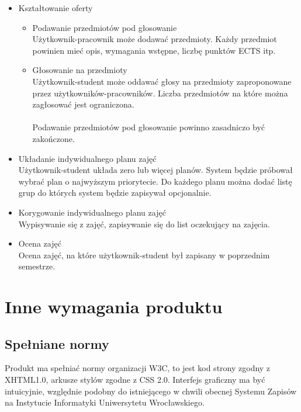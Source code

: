 \documentclass[11pt,leqno]{article}
\begin{document}
\begin{itemize}
\item Kształtowanie oferty
\begin{itemize}
\item Podawanie przedmiotów pod głosowanie \\
Użytkownik-pracownik może dodawać przedmioty. Każdy przedmiot powinien mieć opis, wymagania wstępne, liczbę punktów ECTS itp.

\item Głosowanie na przedmioty \\
Użytkownik-student może oddawać głosy na przedmioty zaproponowane przez użytkowników-pracowników. Liczba przedmiotów na które można zagłosować jest ograniczona. \\ \\

Podawanie przedmiotów pod głosowanie powinno zasadniczo być zakończone.
\end{itemize}

\item Układanie indywidualnego planu zajęć \\
Użytkownik-student układa zero lub więcej planów. System będzie próbował wybrać plan o najwyższym priorytecie. Do każdego planu można dodać listę grup do których system będzie zapisywał opcjonalnie.

\item Korygowanie indywidualnego planu zajęć \\
Wypisywanie się z zajęć, zapisywanie się do list oczekujący na zajęcia.

\item Ocena zajęć \\
Ocena zajęć, na które użytkownik-student był zapisany w poprzednim semestrze.
\end{itemize}

\section{Inne wymagania produktu}

\subsection{Spełniane normy}
Produkt ma spełniać normy organizacji W3C, to jest kod strony zgodny z XHTML1.0, arkusze stylów zgodne z CSS 2.0. Interfejs graficzny ma być intuicyjnie, względnie podobny do istniejącego w chwili obecnej Systemu Zapisów na Instytucie Informatyki Uniwersytetu Wrocławskiego.
\end{document}

